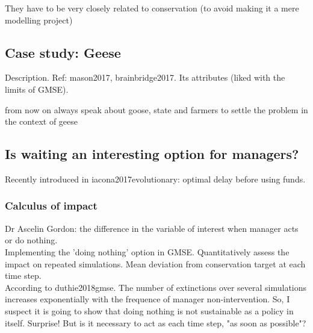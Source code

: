 \documentclass[12pt,a4paper]{article}
\begin{document}
They have to be very closely related to conservation (to avoid making it a mere modelling project)

\subsection{Case study: Geese}

Description. Ref: mason2017, brainbridge2017.
Its attributes (liked with the limits of GMSE). 

from now on always speak about goose, state and farmers to settle the problem in the context of geese

\subsection{Is waiting an interesting option for managers?}

Recently introduced in iacona2017evolutionary: optimal delay before using funds.

\subsubsection{Calculus of impact}
Dr Ascelin Gordon: the difference in the variable of interest when manager acts or do nothing.\\
Implementing the 'doing nothing' option in GMSE. Quantitatively assess the impact on repeated simulations. Mean deviation from conservation target at each time step.\\
According to duthie2018gmse. The number of extinctions over several simulations increases exponentially with the frequence of manager non-intervention. So, I suspect it is going to show that doing nothing is not sustainable as a policy in itself. Surprise!
But is it necessary to act as each time step, "as soon as possible"?
\end{document}
